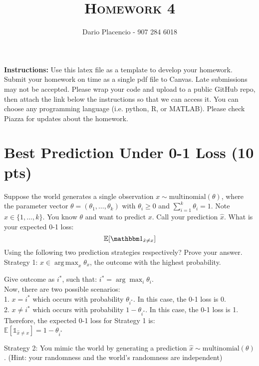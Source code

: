 \documentclass[a4paper]{article}
\title{\textsc{Homework 4}} %
\author{Dario Placencio - 907 284 6018
}
\date{}
\theoremstyle{definition}
\DeclareMathOperator*{\argmax}{arg\,max}
\def\E{\mathbb E}
\def\ind{\mathbbm 1}
\newenvironment{soln}{
    \leavevmode\color{blue}\ignorespaces
}{}
\begin{document}
\maketitle 


\textbf{Instructions:} Use this latex file as a template to develop your homework. Submit your homework on time as a single pdf file to Canvas. Late submissions may not be accepted. Please wrap your code and upload to a public GitHub repo, then attach the link below the instructions so that we can access it. You can choose any programming language (i.e. python, R, or MATLAB). Please check Piazza for updates about the homework.

\section{Best Prediction Under 0-1 Loss (10 pts)}
Suppose the world generates a single observation $x \sim \mbox{multinomial}(\theta)$, where the parameter vector $\theta=(\theta_1, \ldots, \theta_k)$ with $\theta_i\ge 0$ and $\sum_{i=1}^k \theta_i=1$.  Note $x \in \{1, \ldots, k\}$.
You know $\theta$ and want to predict $x$. 
Call your prediction $\hat x$.  What is your expected 0-1 loss: 
$$\E[\ind_{\hat x \neq x}]$$
Using the following two prediction strategies respectively?  Prove your answer. \\

Strategy 1: $\hat x \in \argmax_x \theta_x$, the outcome with the highest probability. \\

\begin{soln}
Give outcome as $i^*$, such that:
$i^* = \arg\max_{i} \theta_i$.\\
Now, there are two possible scenarios:\\

1. $x = i^*$ which occurs with probability $\theta_{i^*}$. In this case, the 0-1 loss is 0.\\
2. $x \neq i^*$ which occurs with probability $1 - \theta_{i^*}$. In this case, the 0-1 loss is 1.\\

Therefore, the expected 0-1 loss for Strategy 1 is:\\

$\mathbb{E}[\mathbb{1}_{\hat x \neq x}] = 1 - \theta_{i^*}$\\

\end{soln}

Strategy 2: You mimic the world by generating a prediction $\hat x \sim \mbox{multinomial}(\theta)$.  (Hint: your randomness and the world's randomness are independent)\\
\end{document}
